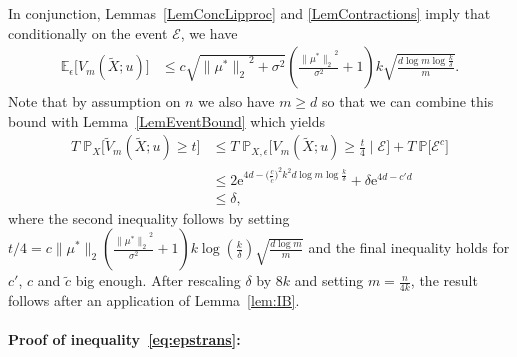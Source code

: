 \documentclass[twoside,11pt]{article}
\newcommand{\numobs}{\ensuremath{n}}
\def\EE{ \mathbb{E} }
\def\E{ \mathrm{e} }							%
\newcommand{\norm}[1]{\ensuremath{\|#1\|_2}}
\newcommand{\paramobs}{\mu}
\newcommand{\trueparamobs}{\ensuremath{\paramobs^*}}
\newcommand{\mprob}{\ensuremath{\mathbb{P}}}
\newcommand{\kdim}{\ensuremath{k}}
\newcommand{\myparagraph}[1]{\paragraph{#1:}}
\newcommand{\Xtil}{\ensuremath{\widetilde{X}}}
\newcommand{\processobs}{\ensuremath{\tilde{V}_m}}
\newcommand{\processradobs}{\ensuremath{V_m}}
\newcommand{\COVNUM}{\ensuremath{T}}
\begin{document}
In conjunction, Lemmas~\ref{LemConcLipproc} and \ref{LemContractions}
imply that conditionally on the event $\mathcal{E}$, we have
\begin{align*}
\EE_{\epsilon} \big[\processradobs(\Xtil;u)\big] & \leq
c\sqrt{\norm{\trueparamobs}^2 + \sigma^2} ( \frac{\norm{\trueparamobs}^2}{\sigma^2} + 1)
k\sqrt{\frac{d \log m \log \frac{k}{\delta}}{m}}.
\end{align*}
Note that by assumption on $\numobs$ we also have $m \geq d$
so that we can combine this bound with Lemma~\ref{LemEventBound} which yields
\begin{align*}
\COVNUM \; \mprob_{X} \big[ \processobs(\Xtil;u)\geq t
  \big] & \leq \COVNUM \; \mprob_{X,\epsilon} \big[
  \processradobs(\Xtil;u) \geq \frac{t}{4} \mid \mathcal{E} \big] +
\COVNUM \: \mprob \big[ \mathcal{E}^c \big] \\
%
& \leq 2 \E^{4d - \big(\frac{c}{\tilde{c}}\big)^2 \kdim^2d \log m \log\frac{\kdim}{\delta}} + \delta \E^{4d-
  c' d } \\
%
& \leq \delta,
\end{align*}
where the second inequality follows by setting $t/4 = c
\norm{\trueparamobs}( \frac{\norm{\trueparamobs}^2}{\sigma^2}+ 1)
k\log (\frac{k}{\delta})\sqrt{\frac{d \log m}{m}}$ and the final inequality
holds for $c'$, $c$ and $\tilde{c}$ big enough. After rescaling
$\delta$ by $8 k$ and setting $m = \frac{\numobs}{4k}$, the result
follows after an application of Lemma~\ref{lem:IB}.




\myparagraph{Proof of inequality~\eqref{eq:epstrans}}
\end{document}

